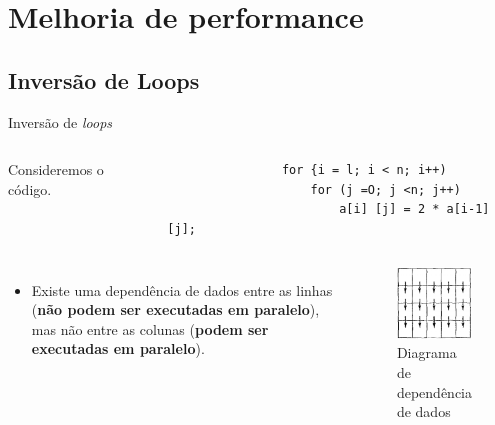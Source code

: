 \newcommand{\aspas}[1]{``#1''}

\section{Melhoria de performance}

\subsection{Inversão de Loops}

\begin{frame}[fragile]{Inversão de \textit{loops}}
	\begin{columns}
			Consideremos o código.
			\begin{verbatim}
				for {i = l; i < n; i++)
					for (j =O; j <n; j++)
						a[i] [j] = 2 * a[i-1] [j];
			\end{verbatim}
	\end{columns}
	\begin{columns}
		\column{0.5\linewidth}
			\begin{itemize}
				\item Existe uma dependência de dados entre as linhas (\textbf{não podem ser executadas em paralelo}), mas não entre as colunas (\textbf{podem ser executadas em paralelo}).
			\end{itemize}
		\column{0.5\linewidth}
			\begin{figure}[H]
				\centering
				\includegraphics[width=0.3\linewidth]{img/quinn/diag-data-dep}
				\caption[Diagrama de dependência de dados]{Diagrama de dependência de dados}
				\label{fig:diag-data-dep}
			\end{figure}
	\end{columns}
\end{frame}

